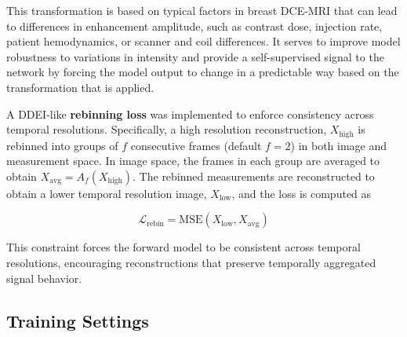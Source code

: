 \documentclass[runningheads]{llncs}
\begin{document}
This transformation is based on typical factors in breast DCE-MRI that can lead to differences in enhancement amplitude, such as contrast dose, injection rate, patient hemodynamics, or scanner and coil differences. It serves to improve model robustness to variations in intensity and provide a self-supervised signal to the network by forcing the model output to change in a predictable way based on the transformation that is applied. 

A DDEI-like \textbf{rebinning loss} was implemented to enforce consistency across temporal resolutions. Specifically, a high resolution reconstruction, $X_\text{high}$ is rebinned into groups of $f$ consecutive frames (default $f=2$) in both image and measurement space. In image space, the frames in each group are averaged to obtain $X_\text{avg} = A_f(X_\text{high})$. The rebinned measurements are reconstructed to obtain a lower temporal resolution image, $X_\text{low}$, and the loss is computed as

\[
\mathcal{L}_\text{rebin} = \mathrm{MSE}(X_\text{low}, X_\text{avg})
\]

This constraint forces the forward model to be consistent across temporal resolutions, encouraging reconstructions that preserve temporally aggregated signal behavior. 


\subsection{Training Settings}
 
\end{document}
